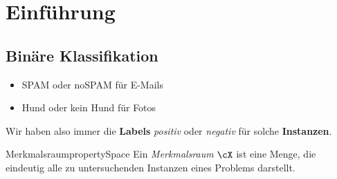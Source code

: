 \documentclass[language=ngerman,algolist,acrolist]{TemplateLecture}
\begin{document}
\setcounter{chapter}{0}


\chapter{Einführung}

\section{Binäre Klassifikation}

\begin{expl}\leavevmode
    \begin{itemize}
        \item SPAM oder noSPAM für E-Mails
        \item Hund oder kein Hund für Fotos
    \end{itemize}
\end{expl}
Wir haben also immer die \textbf{Labels} \emph{positiv} oder \emph{negativ} für solche \textbf{Instanzen}.

\begin{defi}{Merkmalsraum}{propertySpace}
    Ein \emph{Merkmalsraum} $\cX$ ist eine Menge, die eindeutig alle zu untersuchenden Instanzen eines Problems darstellt.
\end{defi}
\end{document}
